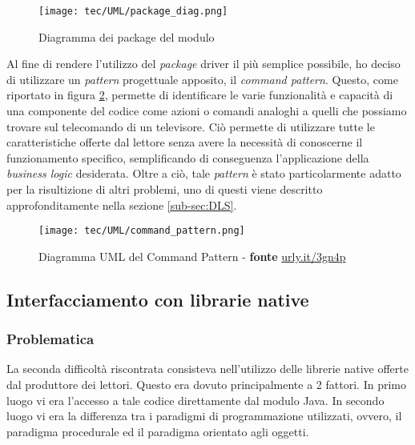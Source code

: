 \begin{figure}[!h] 
    \centering 
    \texttt{[image: tec/UML/package\_diag.png]} 
    \caption{Diagramma dei package del modulo}
    \label{package_diag}
\end{figure}

Al fine di rendere l'utilizzo del \emph{package} driver il più semplice possibile, ho deciso di utilizzare un \emph{pattern} progettuale
apposito, il \emph{command pattern}. Questo, come riportato in figura \ref{command_pattern}, permette di identificare le varie
funzionalità e capacità di una componente del codice come azioni o comandi analoghi a quelli che possiamo trovare sul telecomando
di un televisore. Ciò permette di utilizzare tutte le caratteristiche offerte dal lettore senza avere la necessità di conoscerne il
funzionamento specifico, semplificando di conseguenza l'applicazione della \emph{business logic} desiderata.
Oltre a ciò, tale \emph{pattern} è stato particolarmente adatto per la risultizione di altri problemi, uno di questi viene descritto
approfonditamente nella sezione \ref{sub-sec:DLS}.


\begin{figure}[!h] 
    \centering 
    \texttt{[image: tec/UML/command\_pattern.png]} 
    \caption{Diagramma UML del Command Pattern - \textbf{fonte} \url{urly.it/3gn4p}}
    \label{command_pattern}
\end{figure}

\subsection{Interfacciamento con librarie native}
\subsubsection*{Problematica}
La seconda difficoltà riscontrata consisteva nell'utilizzo delle librerie native offerte dal produttore dei lettori.
Questo era dovuto principalmente a 2 fattori. In primo luogo vi era l'accesso a tale codice direttamente dal modulo Java.
In secondo luogo vi era la differenza tra i paradigmi di programmazione utilizzati, ovvero, il paradigma procedurale ed il paradigma
orientato agli oggetti. 

